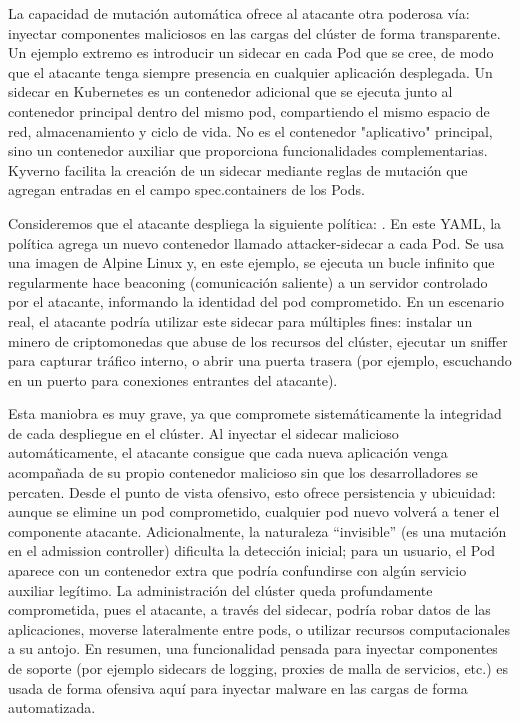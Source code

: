 \documentclass[12pt,twoside,titlepage]{report}
\begin{document}
La capacidad de mutación automática ofrece al atacante otra poderosa vía: inyectar componentes maliciosos en las cargas del clúster de forma transparente. Un ejemplo extremo es introducir un sidecar en cada Pod que se cree, de modo que el atacante tenga siempre presencia en cualquier aplicación desplegada. Un sidecar en Kubernetes es un contenedor adicional que se ejecuta junto al contenedor principal dentro del mismo pod, compartiendo el mismo espacio de red, almacenamiento y ciclo de vida. No es el contenedor "aplicativo" principal, sino un contenedor auxiliar que proporciona funcionalidades complementarias. Kyverno facilita la creación de un sidecar mediante reglas de mutación que agregan entradas en el campo spec.containers de los Pods.

Consideremos que el atacante despliega la siguiente política: . En este YAML, la política agrega un nuevo contenedor llamado attacker-sidecar a cada Pod. Se usa una imagen de Alpine Linux y, en este ejemplo, se ejecuta un bucle infinito que regularmente hace beaconing (comunicación saliente) a un servidor controlado por el atacante, informando la identidad del pod comprometido. En un escenario real, el atacante podría utilizar este sidecar para múltiples fines: instalar un minero de criptomonedas que abuse de los recursos del clúster, ejecutar un sniffer para capturar tráfico interno, o abrir una puerta trasera (por ejemplo, escuchando en un puerto para conexiones entrantes del atacante).

Esta maniobra es muy grave, ya que compromete sistemáticamente la integridad de cada despliegue en el clúster. Al inyectar el sidecar malicioso automáticamente, el atacante consigue que cada nueva aplicación venga acompañada de su propio contenedor malicioso sin que los desarrolladores se percaten. Desde el punto de vista ofensivo, esto ofrece persistencia y ubicuidad: aunque se elimine un pod comprometido, cualquier pod nuevo volverá a tener el componente atacante. Adicionalmente, la naturaleza “invisible” (es una mutación en el admission controller) dificulta la detección inicial; para un usuario, el Pod aparece con un contenedor extra que podría confundirse con algún servicio auxiliar legítimo. La administración del clúster queda profundamente comprometida, pues el atacante, a través del sidecar, podría robar datos de las aplicaciones, moverse lateralmente entre pods, o utilizar recursos computacionales a su antojo. En resumen, una funcionalidad pensada para inyectar componentes de soporte (por ejemplo sidecars de logging, proxies de malla de servicios, etc.) es usada de forma ofensiva aquí para inyectar malware en las cargas de forma automatizada.
\end{document}
